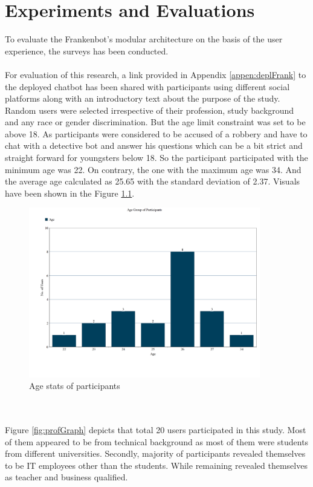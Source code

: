 \chapter{Experiments and Evaluations\label{cha:chapter4}}

To evaluate the Frankenbot's modular architecture on the basis of the user experience, the surveys has been conducted. 
\\~\\
For evaluation of this research, a link provided in Appendix \ref{appen:deplFrank} to the deployed chatbot has been shared with participants using different social platforms along with an introductory text about the purpose of the study. Random users were selected irrespective of their profession, study background and any race or gender discrimination. But the age limit constraint was set to be above 18. As participants were considered to be accused of a robbery and have to chat with a detective bot and answer his questions which can be a bit strict and straight forward for youngsters below 18. So the participant participated with the minimum age was 22. On contrary, the one with the maximum age was 34. And the average age calculated as 25.65 with the standard deviation of 2.37. Visuals have been shown in the Figure \ref{fig:ageGraph}.

\begin{figure}[!h]
    \centering
    \includegraphics[width=0.9\textwidth]{img/Age_Graph_Updated.PNG}
    \caption{Age stats of participants}
    \label{fig:ageGraph}
\end{figure}
\\~\\
Figure \ref{fig:profGraph} depicts that total 20 users participated in this study. Most of them appeared to be from technical background as most of them were students from different universities. Secondly, majority of participants revealed themselves to be IT employees other than the students. While remaining revealed themselves as teacher and business qualified.

